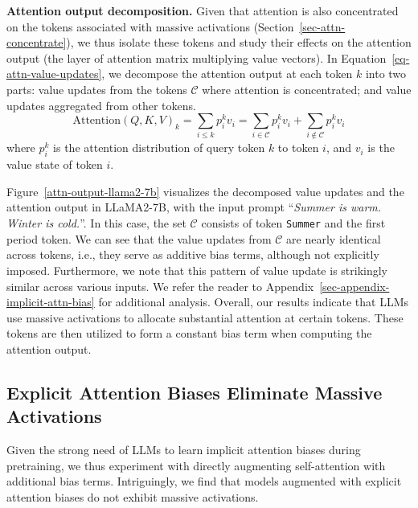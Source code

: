 \documentclass[10pt]{article}
\theoremstyle{definition}
\theoremstyle{plain}
\begin{document}
\textbf{Attention output decomposition.} Given that attention is also concentrated on the tokens associated with massive activations (Section~\ref{sec-attn-concentrate}), we thus isolate these tokens and study their effects on the attention output (the layer of attention matrix multiplying value vectors). In Equation~\ref{eq-attn-value-updates}, we decompose the attention output at each token $k$ into two parts: value updates from the tokens $\mathcal{C}$ where attention is concentrated; and value updates aggregated from other tokens. 
\begin{equation}\label{eq-attn-value-updates}
    \text{Attention}(Q, K, V)_{k} = \sum_{i\le k}p^{k}_{i}v_{i}=\sum_{i\in \mathcal{C}}p^{k}_{i}v_{i}+\sum_{i\notin \mathcal{C}}p^{k}_{i}v_{i}
\end{equation}
where $p^{k}_{i}$ is the attention distribution of query token $k$ to token $i$, and $v_{i}$ is the value state of token $i$. 

Figure~\ref{attn-output-llama2-7b} visualizes the decomposed value updates and the attention output in LLaMA2-7B, with the input prompt ``\textsl{Summer is warm. Winter is cold.}''. In this case, the set $\mathcal{C}$ consists of token \texttt{Summer} and the first period token. We can see that the value updates from $\mathcal{C}$ are nearly identical across tokens, i.e., they serve as additive bias terms, although not explicitly imposed. Furthermore, we note that this pattern of value update is strikingly similar across various inputs. We refer the reader to Appendix~\ref{sec-appendix-implicit-attn-bias} for additional analysis. Overall, our results indicate that LLMs use massive activations to allocate substantial attention at certain tokens. These tokens are then utilized to form a constant bias term when computing the attention output.



\subsection{Explicit Attention Biases Eliminate Massive Activations}\label{sec-explicit-attn-bias}

Given the strong need of LLMs to learn implicit attention biases during pretraining, we thus experiment with directly augmenting self-attention with additional bias terms. Intriguingly, we find that models augmented with explicit attention biases do not exhibit massive activations.
\end{document}
